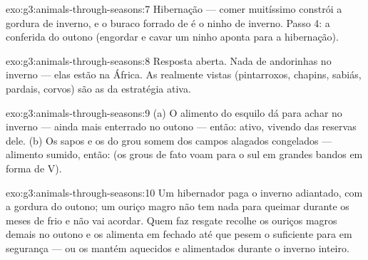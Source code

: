 \begin{solution}{exo:g3:animals-through-seasons:7}
Hibernação --- comer muitíssimo constrói a gordura de inverno, e o
buraco forrado de  é o ninho de inverno. Passo 4: a conferida
do outono (engordar e cavar um ninho aponta para a hibernação).
\end{solution}

\begin{solution}{exo:g3:animals-through-seasons:8}
Resposta aberta. Nada de andorinhas no inverno --- elas estão na
África. As  realmente vistas (pintarroxos, chapins, sabiás,
pardais, corvos) são as da estratégia ativa.
\end{solution}

\begin{solution}{exo:g3:animals-through-seasons:9}
(a) O alimento do esquilo dá para achar no inverno --- ainda mais
enterrado no outono --- então: ativo, vivendo das reservas dele. (b)
Os sapos e os  do grou somem dos campos alagados congelados
--- alimento sumido, então:  (os grous de fato voam para o
sul em grandes bandos em forma de V).
\end{solution}

\begin{solution}{exo:g3:animals-through-seasons:10}
Um hibernador paga o inverno adiantado, com a gordura do outono; um
ouriço magro não tem nada para queimar durante os meses de  frio
e não vai acordar. Quem faz resgate recolhe os ouriços magros demais
no outono e os alimenta em  fechado até que pesem o
suficiente para  em segurança --- ou os mantém aquecidos e
alimentados durante o inverno inteiro.
\end{solution}
